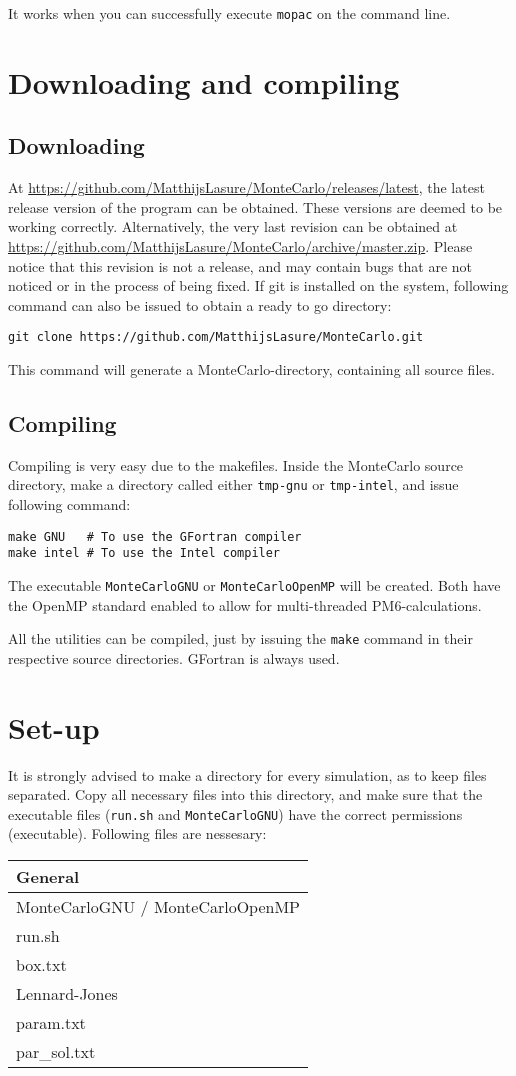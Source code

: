 It works when you can successfully execute \verb|mopac| on the command line.

\section{Downloading and compiling}

\subsection{Downloading}
At \url{https://github.com/MatthijsLasure/MonteCarlo/releases/latest}, the 
latest release version of the program can be obtained. These versions are 
deemed to be working correctly.
Alternatively, the very last revision can be obtained at 
\url{https://github.com/MatthijsLasure/MonteCarlo/archive/master.zip}.
Please notice that this revision is not a release, and may contain bugs that 
are not noticed or in the process of being fixed. If git is installed on the 
system, following command can also be issued to obtain a ready to go directory:

\begin{lstlisting}[caption=Clone with git]
git clone https://github.com/MatthijsLasure/MonteCarlo.git
\end{lstlisting}

This command will generate a MonteCarlo-directory, containing all source files.

\subsection{Compiling}
Compiling is very easy due to the makefiles.
Inside the MonteCarlo source directory, make a directory called either 
\verb|tmp-gnu| or \verb|tmp-intel|, and issue following command:

\begin{lstlisting}[caption=Compiling the main program]
make GNU   # To use the GFortran compiler
make intel # To use the Intel compiler
\end{lstlisting}

The executable \verb|MonteCarloGNU| or \verb|MonteCarloOpenMP| will be created.
Both have the OpenMP standard enabled to allow for multi-threaded 
PM6-calculations.

All the utilities can be compiled, just by issuing the \verb|make| command in 
their respective source directories. GFortran is always used.

\section{Set-up}
It is strongly advised to make a directory for every simulation, as to keep 
files separated. Copy all necessary files into this directory, and make sure 
that the executable files (\verb|run.sh| and \verb|MonteCarloGNU|) have the 
correct permissions (executable). Following files are nessesary:

\begin{tabular}{l}
	General \\ \hline
	MonteCarloGNU / MonteCarloOpenMP \\
	run.sh \\
	box.txt \\
	Lennard-Jones \\ \hline
	param.txt \\
	par\_sol.txt \\
\end{tabular}